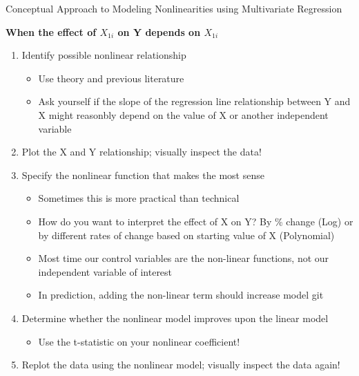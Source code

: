 \documentclass[8pt,ignorenonframetext,dvipsnames]{beamer}
\providecommand{\tightlist}{%
  \setlength{\itemsep}{0pt}\setlength{\parskip}{0pt}}
\renewcommand{\textbf}[1]{{\color{darkgray}\bfseries\fontfamily{Montserrat-TOsF}#1}}
\let\olditem\item
\renewcommand{\item}{%
  \olditem\vspace{4pt}
}
\begin{document}
\begin{frame}{Conceptual Approach to Modeling Nonlinearities using
Multivariate Regression}
\protect\hypertarget{conceptual-approach-to-modeling-nonlinearities-using-multivariate-regression}{}

\textbf{When the effect of \(X_{1i}\) on Y depends on \(X_{1i}\)}

\medskip

\begin{enumerate}
\tightlist
\item
  Identify possible nonlinear relationship

  \begin{itemize}
  \tightlist
  \item
    Use theory and previous literature
  \item
    Ask yourself if the slope of the regression line relationship
    between Y and X might reasonbly depend on the value of X or another
    independent variable
  \end{itemize}
\item
  Plot the X and Y relationship; visually inspect the data!
\item
  Specify the nonlinear function that makes the most sense

  \begin{itemize}
  \tightlist
  \item
    Sometimes this is more practical than technical
  \item
    How do you want to interpret the effect of X on Y? By \% change
    (Log) or by different rates of change based on starting value of X
    (Polynomial)
  \item
    Most time our control variables are the non-linear functions, not
    our independent variable of interest
  \item
    In prediction, adding the non-linear term should increase model git
  \end{itemize}
\item
  Determine whether the nonlinear model improves upon the linear model

  \begin{itemize}
  \tightlist
  \item
    Use the t-statistic on your nonlinear coefficient!
  \end{itemize}
\item
  Replot the data using the nonlinear model; visually inspect the data
  again!
\end{enumerate}

\end{frame}
\end{document}
